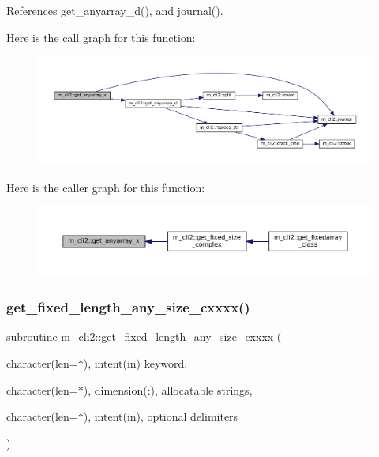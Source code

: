 References get\+\_\+anyarray\+\_\+d(), and journal().

Here is the call graph for this function\+:\nopagebreak
\begin{figure}[H]
\begin{center}
\leavevmode
\includegraphics[width=350pt]{namespacem__cli2_ab9ab288fa5f108beeb7c94d81b223b7c_cgraph}
\end{center}
\end{figure}
Here is the caller graph for this function\+:\nopagebreak
\begin{figure}[H]
\begin{center}
\leavevmode
\includegraphics[width=350pt]{namespacem__cli2_ab9ab288fa5f108beeb7c94d81b223b7c_icgraph}
\end{center}
\end{figure}
\mbox{\label{namespacem__cli2_abc31389c45dcd95b8db641b59b98b447}} 
\subsubsection{\texorpdfstring{get\+\_\+fixed\+\_\+length\+\_\+any\+\_\+size\+\_\+cxxxx()}{get\_fixed\_length\_any\_size\_cxxxx()}}
{\footnotesize\ttfamily subroutine m\+\_\+cli2\+::get\+\_\+fixed\+\_\+length\+\_\+any\+\_\+size\+\_\+cxxxx (\begin{DoxyParamCaption}\item[{character(len=$\ast$), intent(in)}]{keyword,  }\item[{character(len=$\ast$), dimension(\+:), allocatable}]{strings,  }\item[{character(len=$\ast$), intent(in), optional}]{delimiters }\end{DoxyParamCaption})\hspace{0.3cm}{\ttfamily [private]}}



